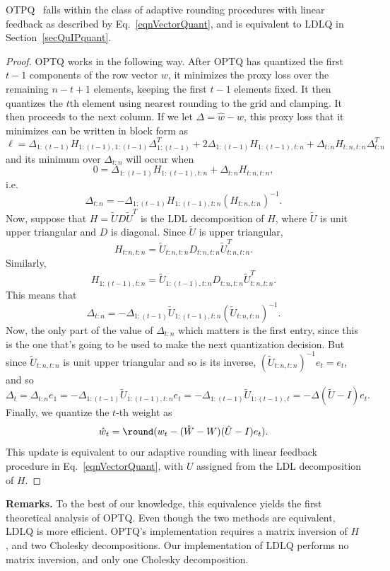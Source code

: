 \begin{theoremrep}
OTPQ~\citep{frantar2023gptq} falls within the class of adaptive rounding procedures with linear feedback as described by Eq.~\eqref{eqnVectorQuant}, and is equivalent to LDLQ in Section~\ref{secQuIPquant}.
\end{theoremrep}
\begin{proof}
OPTQ works in the following way.
After OPTQ has quantized the first $t-1$ components of the row vector $w$, it minimizes the proxy loss over the remaining $n-t+1$ elements, keeping the first $t-1$ elements fixed.
It then quantizes the $t$th element using nearest rounding to the grid and clamping.
It then proceeds to the next column.
If we let $\Delta = \hat w - w$, this proxy loss that it minimizes can be written in block form as
$$
\ell = \Delta_{1:(t-1)} H_{1:(t-1),1:(t-1)} \Delta_{1:(t-1)}^T + 2 \Delta_{1:(t-1)} H_{1:(t-1),t:n} + \Delta_{t:n} H_{t:n,t:n} \Delta_{t:n}^T
$$
and its minimum over $\Delta_{t:n}$ will occur when
$$
0 = \Delta_{1:(t-1)} H_{1:(t-1),t:n} + \Delta_{t:n} H_{t:n,t:n},
$$
i.e.
$$
\Delta_{t:n} = -\Delta_{1:(t-1)} H_{1:(t-1),t:n} \left( H_{t:n,t:n} \right)^{-1}.
$$
Now, suppose that $H = \tilde U D \tilde U^T$ is the LDL decomposition of $H$, where $\tilde U$ is unit upper triangular and $D$ is diagonal. Since $\tilde U$ is upper triangular,
$$
H_{t:n,t:n} = \tilde U_{t:n,t:n} D_{t:n,t:n} \tilde U_{t:n,t:n}^T.
$$
Similarly,
$$
H_{1:(t-1),t:n} = \tilde U_{1:(t-1),t:n} D_{t:n,t:n} \tilde U_{t:n,t:n}^T.
$$
This means that
$$
\Delta_{t:n} = -\Delta_{1:(t-1)} \tilde U_{1:(t-1),t:n} \left( \tilde U_{t:n,t:n} \right)^{-1}.
$$
Now, the only part of the value of $\Delta_{t:n}$ which matters is the first entry, since this is the one that's going to be used to make the next quantization decision. But since $\tilde U_{t:n,t:n}$ is unit upper triangular and so is its inverse, $\left( \tilde U_{t:n,t:n} \right)^{-1} e_t = e_t$, and so
$$
\Delta_t = \Delta_{t:n} e_1 = -\Delta_{1:(t-1)} \tilde U_{1:(t-1),t:n} e_t = -\Delta_{1:(t-1)} \tilde U_{1:(t-1),t} = -\Delta (\tilde U - I) e_t.
$$
Finally, we quantize the $t$-th weight as
\[
    \hat w_t
    =
    \round( w_t - (\hat W - W) (\tilde U - I) e_t ).
\]
This update is equivalent to our adaptive rounding with linear feedback procedure in Eq.~\eqref{eqnVectorQuant}, with $U$ assigned from the LDL decomposition of $H$.
\end{proof}

\textbf{Remarks.}
To the best of our knowledge, this equivalence yields the first theoretical analysis of OPTQ.
Even though the two methods are equivalent, LDLQ is more efficient.
OPTQ's implementation requires a matrix inversion of $H$, and two Cholesky decompositions.
Our implementation of LDLQ performs no matrix inversion, and only one Cholesky decomposition.

